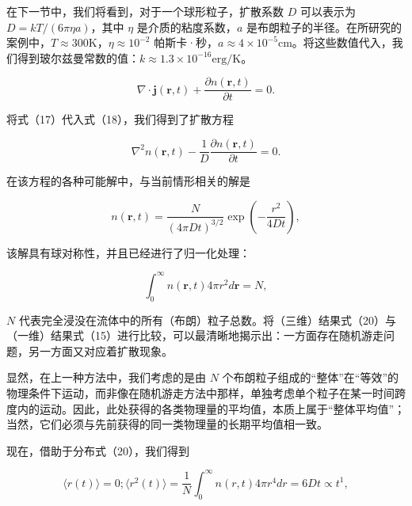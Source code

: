 在下一节中，我们将看到，对于一个球形粒子，扩散系数 \(D\) 可以表示为 \(D = kT / (6\pi\eta a)\)，其中 \(\eta\) 是介质的粘度系数，\(a\) 是布朗粒子的半径。在所研究的案例中，\(T \approx 300\mathrm{K}\)，\(\eta \approx 10^{-2}\) 帕斯卡·秒，\(a \approx 4 \times 10^{-5}\mathrm{cm}\)。将这些数值代入，我们得到玻尔兹曼常数的值：\(k \approx 1.3 \times 10^{-16}\mathrm{erg/K}\)。

\begin{equation}\tag{15.2.17}\label{eq:15.2.17_continuity}
\nabla \cdot \mathbf { j } ( \pmb { r } , t ) + \frac { \partial n ( \pmb { r } , t ) } { \partial t } = 0 .
\end{equation}

将式（17）代入式（18），我们得到了扩散方程

\begin{equation}\tag{15.2.19}\label{eq:15.2.19}
\nabla ^{2} n ( \mathbf { r } , t ) - \frac { 1 } { D } \frac { \partial n ( \mathbf { r } , t ) } { \partial t } = 0 .
\end{equation}

在该方程的各种可能解中，与当前情形相关的解是

\begin{equation}\tag{15.2.20}\label{eq:15.2.20}
n ( \pmb { r } , t ) = \frac { N } { ( 4 \pi D t ) ^{3 / 2} } \exp \left( - \frac { r ^{2} } { 4 D t } \right) ,
\end{equation}

该解具有球对称性，并且已经进行了归一化处理：

\begin{equation}\tag{15.2.21}\label{eq:15.2.21}
\int _ { 0 } ^{\infty} n ( \mathbf { r } , t ) 4 \pi r ^{2} d \mathbf { r } = N ,
\end{equation}

\(N\) 代表完全浸没在流体中的所有（布朗）粒子总数。将（三维）结果式（20）与（一维）结果式（15）进行比较，可以最清晰地揭示出：一方面存在随机游走问题，另一方面又对应着扩散现象。

显然，在上一种方法中，我们考虑的是由 \(N\) 个布朗粒子组成的``整体''在``等效''的物理条件下运动，而非像在随机游走方法中那样，单独考虑单个粒子在某一时间跨度内的运动。因此，此处获得的各类物理量的平均值，本质上属于``整体平均值''；当然，它们必须与先前获得的同一类物理量的长期平均值相一致。

现在，借助于分布式（20），我们得到

\begin{equation}\tag{15.2.22}\label{eq:15.2.22}
\langle r ( t ) \rangle = 0 ;  \langle r ^{2} ( t ) \rangle = \frac { 1 } { N } \int _ { 0 } ^{\infty} n ( r , t ) 4 \pi r ^{4} d r = 6 D t \propto t ^{1} ,
\end{equation}

